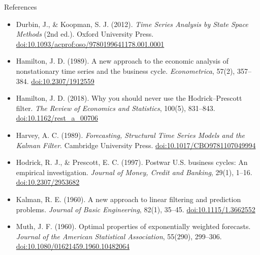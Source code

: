 \begin{frame}{References}
\itemsize{\tiny}
\begin{itemize}
    \item Durbin, J., \& Koopman, S. J. (2012). \textit{Time Series Analysis by State Space Methods} (2nd ed.). Oxford University Press. \href{https://doi.org/10.1093/acprof:oso/9780199641178.001.0001}{doi:10.1093/acprof:oso/9780199641178.001.0001}
    \item Hamilton, J. D. (1989). A new approach to the economic analysis of nonstationary time series and the business cycle. \textit{Econometrica}, 57(2), 357--384. \href{https://doi.org/10.2307/1912559}{doi:10.2307/1912559}
    \item Hamilton, J. D. (2018). Why you should never use the Hodrick--Prescott filter. \textit{The Review of Economics and Statistics}, 100(5), 831--843. \href{https://doi.org/10.1162/rest\_a\_00706}{doi:10.1162/rest\_a\_00706}
    \item Harvey, A. C. (1989). \textit{Forecasting, Structural Time Series Models and the Kalman Filter}. Cambridge University Press. \href{https://doi.org/10.1017/CBO9781107049994}{doi:10.1017/CBO9781107049994}
    \item Hodrick, R. J., \& Prescott, E. C. (1997). Postwar U.S. business cycles: An empirical investigation. \textit{Journal of Money, Credit and Banking}, 29(1), 1--16. \href{https://doi.org/10.2307/2953682}{doi:10.2307/2953682}
    \item Kalman, R. E. (1960). A new approach to linear filtering and prediction problems. \textit{Journal of Basic Engineering}, 82(1), 35--45. \href{https://doi.org/10.1115/1.3662552}{doi:10.1115/1.3662552}
    \item Muth, J. F. (1960). Optimal properties of exponentially weighted forecasts. \textit{Journal of the American Statistical Association}, 55(290), 299--306. \href{https://doi.org/10.1080/01621459.1960.10482064}{doi:10.1080/01621459.1960.10482064}
\end{itemize}
\end{frame}


